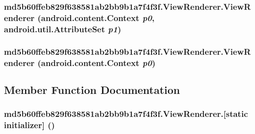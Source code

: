 \hypertarget{classmd5b60ffeb829f638581ab2bb9b1a7f4f3f_1_1_view_renderer_db13c4a3014dd0c910b8ccf98f0c66c8}{
\subsubsection[{ViewRenderer}]{\setlength{\rightskip}{0pt plus 5cm}md5b60ffeb829f638581ab2bb9b1a7f4f3f.ViewRenderer.ViewRenderer (android.content.Context {\em p0}, \/  android.util.AttributeSet {\em p1})}}
\label{classmd5b60ffeb829f638581ab2bb9b1a7f4f3f_1_1_view_renderer_db13c4a3014dd0c910b8ccf98f0c66c8}


\hypertarget{classmd5b60ffeb829f638581ab2bb9b1a7f4f3f_1_1_view_renderer_6c38e734de3e5855f03713824966678f}{
\subsubsection[{ViewRenderer}]{\setlength{\rightskip}{0pt plus 5cm}md5b60ffeb829f638581ab2bb9b1a7f4f3f.ViewRenderer.ViewRenderer (android.content.Context {\em p0})}}
\label{classmd5b60ffeb829f638581ab2bb9b1a7f4f3f_1_1_view_renderer_6c38e734de3e5855f03713824966678f}




\subsection{Member Function Documentation}
\hypertarget{classmd5b60ffeb829f638581ab2bb9b1a7f4f3f_1_1_view_renderer_ec3c17e00fab196999735579e51f409f}{
\subsubsection[{[static initializer]}]{\setlength{\rightskip}{0pt plus 5cm}md5b60ffeb829f638581ab2bb9b1a7f4f3f.ViewRenderer.\mbox{[}static initializer\mbox{]} ()}}
\label{classmd5b60ffeb829f638581ab2bb9b1a7f4f3f_1_1_view_renderer_ec3c17e00fab196999735579e51f409f}




